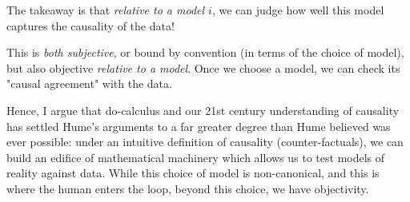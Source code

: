 \documentclass{article}
\begin{document}
The takeaway is that \textit{relative to a model $i$}, we can judge how well
this model captures the causality of the data!

This is \textit{both subjective}, or bound by convention (in terms of the choice
of model), but also objective \textit{relative to a model}. Once we choose a
model, we can check its "causal agreement" with the data.

Hence, I argue that do-calculus and our 21st century understanding of 
causality has settled Hume's arguments to a far greater degree than Hume
believed was ever possible: under an intuitive definition of causality (counter-factuals),
we can build an edifice of mathematical machinery which allows us to test models
of reality against data. While this choice of model is non-canonical, and this
is where the human enters the loop, beyond this choice, we have objectivity.

\nocite{*} \printbibliography
\end{document}
